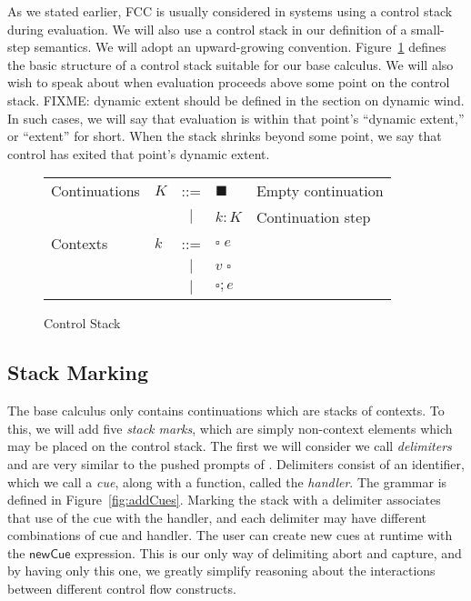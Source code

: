 \documentclass[11pt]{article}
\newcommand{\newhandler}{\textsf{newCue}}
\begin{document}
As we stated earlier, FCC is usually considered in systems using a control stack during evaluation.
We will also use a control stack in our definition of a small-step semantics.
We will adopt an upward-growing convention.
Figure~\ref{fig:controlStack} defines the basic structure of a control stack suitable for our base calculus.
We will also wish to speak about when evaluation proceeds above some point on the control stack.
FIXME: dynamic extent should be defined in the section on dynamic wind.
In such cases, we will say that evaluation is within that point's ``dynamic extent,'' or ``extent'' for short.
When the stack shrinks beyond some point, we say that control has exited that point's dynamic extent.

\begin{figure}[h!]
\caption{Control Stack}
\label{fig:controlStack}
\begin{tabular}{llcll}
Continuations & $K$ & ::= & $\blacksquare$ & Empty continuation \\
& & $|$ & $k:K$ & Continuation step \\
Contexts & $k$ & ::= & $\square\;e$\\
& & $|$ & $v\;\square$ \\
& & $|$ & $\square;e$ \\
\end{tabular}
\end{figure}

\subsection{Stack Marking}

The base calculus only contains continuations which are stacks of contexts.
To this, we will add five \emph{stack marks}, which are simply non-context elements which may be placed on the control stack.
The first we will consider we call \emph{delimiters} and are very similar to the pushed prompts of \cite{MFDC}.
Delimiters consist of an identifier, which we call a \emph{cue}, along with a function, called the \emph{handler}.
The grammar is defined in Figure~\ref{fig:addCues}.
Marking the stack with a delimiter associates that use of the cue with the handler, and each delimiter may have different combinations of cue and handler.
The user can create new cues at runtime with the $\newhandler$ expression.
This is our only way of delimiting abort and capture, and by having only this one, we greatly simplify reasoning about the interactions between different control flow constructs.
\end{document}
